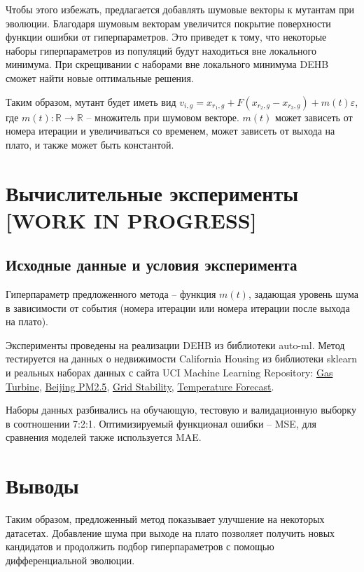\documentclass{article}
\begin{document}
Чтобы этого избежать, предлагается добавлять шумовые векторы к мутантам при эволюции. Благодаря шумовым векторам увеличится покрытие поверхности функции ошибки от гиперпараметров. Это приведет к тому, что некоторые наборы гиперпараметров из популяций будут находиться вне локального минимума. При скрещивании с наборами вне локального минимума DEHB сможет найти новые оптимальные решения.

Таким образом, мутант будет иметь вид $v_{i, g} = x_{r_1, g} + F(x_{r_2, g} - x_{r_3, g}) + m(t)\varepsilon$, где $m(t): \mathbb{R} \to \mathbb{R}$ -- множитель при шумовом векторе. $m(t)$ может зависеть от номера итерации и увеличиваться со временем, может зависеть от выхода на плато, и также может быть константой.

\section{Вычислительные эксперименты [WORK IN PROGRESS]}

\subsection{Исходные данные и условия эксперимента}
Гиперпараметр предложенного метода -- функция $m(t)$, задающая уровень шума в зависимости от события (номера итерации или номера итерации после выхода на плато).

Эксперименты проведены на реализации DEHB из библиотеки auto-ml. 
Метод тестируется на  данных о недвижимости California Housing из библиотеки sklearn и реальных наборах данных с сайта UCI Machine Learning Repository: \href{https://archive.ics.uci.edu/ml/datasets/Gas+Turbine+CO+and+NOx+Emission+Data+Set#}{Gas Turbine}, \href{https://archive.ics.uci.edu/ml/datasets/Beijing+PM2.5+Data}{Beijing PM2.5}, \href{https://archive.ics.uci.edu/ml/datasets/Electrical+Grid+Stability+Simulated+Data+}{Grid Stability}, \href{https://archive.ics.uci.edu/ml/datasets/Bias+correction+of+numerical+prediction+model+temperature+forecast}{Temperature Forecast}.

Наборы данных разбивались на обучающую, тестовую и валидационную выборку в соотношении 7:2:1. Оптимизируемый функционал ошибки -- MSE, для сравнения моделей также используется MAE. 

\section{Выводы}
Таким образом, предложенный метод показывает улучшение на некоторых датасетах. Добавление шума при выходе на плато позволяет получить новых кандидатов и продолжить подбор гиперпараметров с помощью дифференциальной эволюции.
\end{document}
